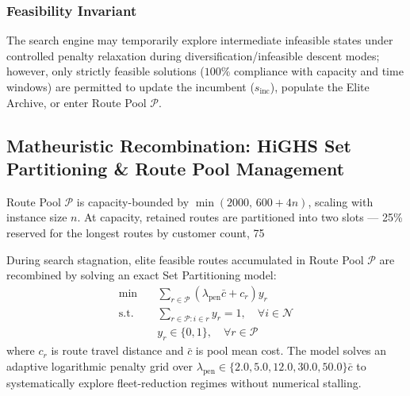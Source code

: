 \subsubsection{Feasibility Invariant}
The search engine may temporarily explore intermediate infeasible states under controlled penalty relaxation during diversification/infeasible descent modes; however, only strictly feasible solutions ($100\%$ compliance with capacity and time windows) are permitted to update the incumbent ($s_{\text{inc}}$), populate the Elite Archive, or enter Route Pool $\mathcal{P}$.

\subsection{Matheuristic Recombination: HiGHS Set Partitioning \& Route Pool Management}
\label{sec:set_partitioning}

Route Pool $\mathcal{P}$ is capacity-bounded by $\min(2000,\,600+4n)$, scaling with instance size $n$. At capacity, retained routes are partitioned into two slots — 25\% reserved for the longest routes by customer count, 75%

During search stagnation, elite feasible routes accumulated in Route Pool $\mathcal{P}$ are recombined by solving an exact Set Partitioning model:
\begin{align}
  \min \quad &\sum_{r \in \mathcal{P}} \left( \lambda_{\text{pen}} \bar{c} + c_r \right) y_r \label{eq:sp_obj} \\
  \text{s.t.} \quad &\sum_{r \in \mathcal{P} : i \in r} y_r = 1, \quad \forall i \in \mathcal{N} \label{eq:sp_cover} \\
  &y_r \in \{0, 1\}, \quad \forall r \in \mathcal{P} \label{eq:sp_binary}
\end{align}
where $c_r$ is route travel distance and $\bar{c}$ is pool mean cost. The model solves an adaptive logarithmic penalty grid over $\lambda_{\text{pen}} \in \{2.0, 5.0, 12.0, 30.0, 50.0\}\bar{c}$ to systematically explore fleet-reduction regimes without numerical stalling.

